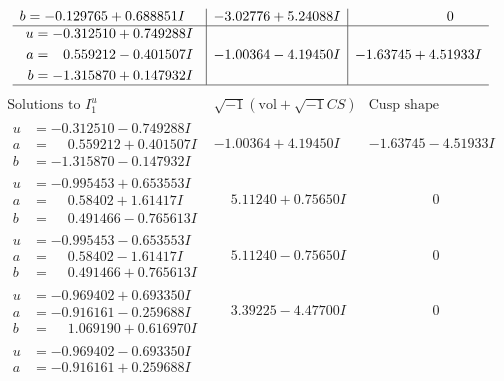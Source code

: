 \documentclass[1p]{elsarticle_modified}
\theoremstyle{definition}
\newcommand{\I}{\sqrt{-1}}
\begin{document}
$$\begin{array}{c|c|c}
\begin{aligned}
b &= -0.129765 + 0.688851 I\end{aligned}
 & -3.02776 + 5.24088 I & \phantom{-0.000000 } 0 \\ \hline\begin{aligned}
u &= -0.312510 + 0.749288 I \\
a &= \phantom{-}0.559212 - 0.401507 I \\
b &= -1.315870 + 0.147932 I\end{aligned}
 & -1.00364 - 4.19450 I & -1.63745 + 4.51933 I\\
 \hline 
 \end{array}$$\newpage$$\begin{array}{c|c|c}  
\text{Solutions to }I^u_{1}& \I (\text{vol} + \sqrt{-1}CS) & \text{Cusp shape}\\
 \hline 
\begin{aligned}
u &= -0.312510 - 0.749288 I \\
a &= \phantom{-}0.559212 + 0.401507 I \\
b &= -1.315870 - 0.147932 I\end{aligned}
 & -1.00364 + 4.19450 I & -1.63745 - 4.51933 I \\ \hline\begin{aligned}
u &= -0.995453 + 0.653553 I \\
a &= \phantom{-}0.58402 + 1.61417 I \\
b &= \phantom{-}0.491466 - 0.765613 I\end{aligned}
 & \phantom{-}5.11240 + 0.75650 I & \phantom{-0.000000 } 0 \\ \hline\begin{aligned}
u &= -0.995453 - 0.653553 I \\
a &= \phantom{-}0.58402 - 1.61417 I \\
b &= \phantom{-}0.491466 + 0.765613 I\end{aligned}
 & \phantom{-}5.11240 - 0.75650 I & \phantom{-0.000000 } 0 \\ \hline\begin{aligned}
u &= -0.969402 + 0.693350 I \\
a &= -0.916161 - 0.259688 I \\
b &= \phantom{-}1.069190 + 0.616970 I\end{aligned}
 & \phantom{-}3.39225 - 4.47700 I & \phantom{-0.000000 } 0 \\ \hline\begin{aligned}
u &= -0.969402 - 0.693350 I \\
a &= -0.916161 + 0.259688 I \\

\end{aligned}
\end{array}$$
\end{document}
